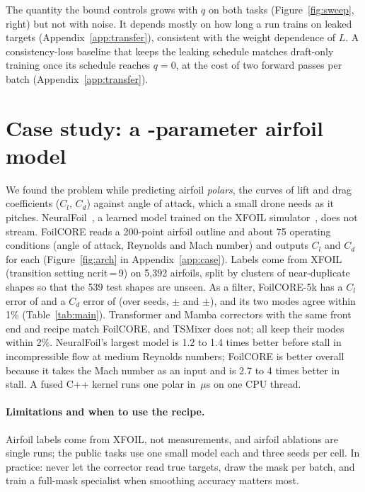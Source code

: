 \documentclass{article}
\begin{document}
The quantity the bound controls grows with $q$ on both tasks (Figure~\ref{fig:sweep}, right) but not with noise. It depends mostly on how long a run trains on leaked targets (Appendix~\ref{app:transfer}), consistent with the weight dependence of $L$. A consistency-loss baseline that keeps the leaking schedule matches draft-only training once its schedule reaches $q{=}0$, at the cost of two forward passes per batch (Appendix~\ref{app:transfer}).

\section{Case study: a \NParamsMain-parameter airfoil model}
\label{sec:case}
\begin{table}[t]
\centering\scriptsize
\caption{MAE on 34,043 test polars of unseen airfoil shapes, streaming unless marked smooth; parentheses: $C_d$ in stall. NeuralFoil on 1,024 polars. MACs/pt: multiply-accumulates per point. Latency: 68-point polar, one CPU thread.}
\label{tab:main}
\setlength{\tabcolsep}{2.0pt}

\end{table}

We found the problem while predicting airfoil \emph{polars}, the curves of lift and drag coefficients ($C_l$, $C_d$) against angle of attack, which a small drone needs as it pitches. NeuralFoil~\citep{neuralfoil}, a learned model trained on the XFOIL simulator~\citep{xfoil}, does not stream. FoilCORE reads a 200-point airfoil outline and about 75 operating conditions (angle of attack, Reynolds and Mach number) and outputs $C_l$ and $C_d$ for each (Figure~\ref{fig:arch} in Appendix~\ref{app:case}). Labels come from XFOIL (transition setting ncrit\,=\,9) on 5,392 airfoils, split by clusters of near-duplicate shapes so that the 539 test shapes are unseen. As a filter, FoilCORE-5k has a $C_l$ error of \MainClAR{} and a $C_d$ error of \MainCdAR{} (over \SeedN{} seeds, \SeedClMean$\pm$\SeedClStd{} and \SeedCdMean$\pm$\SeedCdStd), and its two modes agree within 1\% (Table~\ref{tab:main}). Transformer and Mamba correctors with the same front end and recipe match FoilCORE, and TSMixer does not; all keep their modes within 2\%. NeuralFoil's largest model is 1.2 to 1.4 times better before stall in incompressible flow at medium Reynolds numbers; FoilCORE is better overall because it takes the Mach number as an input and is 2.7 to 4 times better in stall. A fused C++ kernel runs one polar in \MainFusedUs\,$\mu$s on one CPU thread.

\paragraph{Limitations and when to use the recipe.}
\label{sec:limits}
Airfoil labels come from XFOIL, not measurements, and airfoil ablations are single runs; the public tasks use one small model each and three seeds per cell. In practice: never let the corrector read true targets, draw the mask per batch, and train a full-mask specialist when smoothing accuracy matters most.
\end{document}
